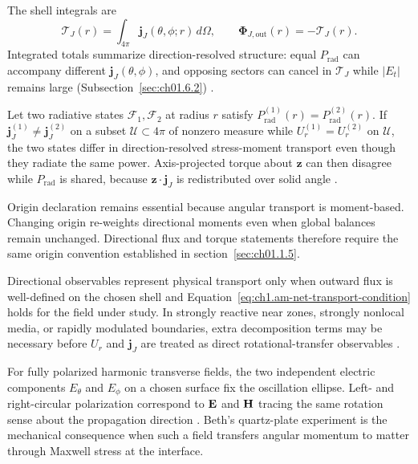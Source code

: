 The shell integrals are
\begin{equation}
\label{eq:ch1.directional-am-total}
\boldsymbol{\mathcal{T}}_J(r)=
\int_{4\pi}\mathbf{j}_J(\theta,\phi;r)\,d\Omega,
\qquad
\boldsymbol{\Phi}_{J,\mathrm{out}}(r)=-\boldsymbol{\mathcal{T}}_J(r).
\end{equation}
Integrated totals summarize direction-resolved structure: equal $P_{\mathrm{rad}}$ can accompany different $\mathbf{j}_J(\theta,\phi)$, and opposing sectors can cancel in $\boldsymbol{\mathcal{T}}_J$ while $|E_t|$ remains large (Subsection~\ref{sec:ch01.6.2}) \cite{stratton1941,belinfante1940}.

\label{prop:ch1.directional-nonequivalence}
Let two radiative states \(\mathcal{F}_1,\mathcal{F}_2\) at radius \(r\) satisfy
\(P_{\mathrm{rad}}^{(1)}(r)=P_{\mathrm{rad}}^{(2)}(r)\). If \(\mathbf{j}_J^{(1)}\neq\mathbf{j}_J^{(2)}\) on a subset \(\mathcal{U}\subset4\pi\) of nonzero measure while \(U_r^{(1)}=U_r^{(2)}\) on \(\mathcal{U}\), the two states differ in direction-resolved stress-moment transport even though they radiate the same power. Axis-projected torque about \(\hat{\mathbf{z}}\) can then disagree while \(P_{\mathrm{rad}}\) is shared, because \(\hat{\mathbf{z}}\cdot\mathbf{j}_J\) is redistributed over solid angle \cite{stratton1941}.

Origin declaration remains essential because angular transport is moment-based.
Changing origin re-weights directional moments even when global balances remain
unchanged. Directional flux and torque statements therefore require the same origin convention established in section~\ref{sec:ch01.1.5}.

Directional observables represent physical transport
only when outward flux is well-defined on the chosen shell and Equation~\eqref{eq:ch1.am-net-transport-condition} holds for the field under study.
In strongly reactive near zones, strongly nonlocal media, or rapidly modulated
boundaries, extra decomposition terms may be necessary before \(U_r\) and
\(\mathbf{j}_J\) are treated as direct rotational-transfer observables
\cite{stratton1941}.

For fully polarized harmonic transverse fields, the two independent electric
components \(E_\theta\) and \(E_\phi\) on a chosen surface fix the oscillation
ellipse. Left- and right-circular polarization correspond to \(\mathbf{E}\) and \(\mathbf{H}\)
tracing the same rotation sense about the propagation direction
\cite{stratton1941}. Beth's quartz-plate experiment \cite{beth1936} is the
mechanical consequence when such a field transfers angular momentum to matter
through Maxwell stress at the interface.
\label{eq:ch1.polarization-ellipse-angles}
\label{eq:ch1.jones-rotation}
\label{eq:ch1.coherency-matrix}
\label{eq:ch1.polarization-degree}

